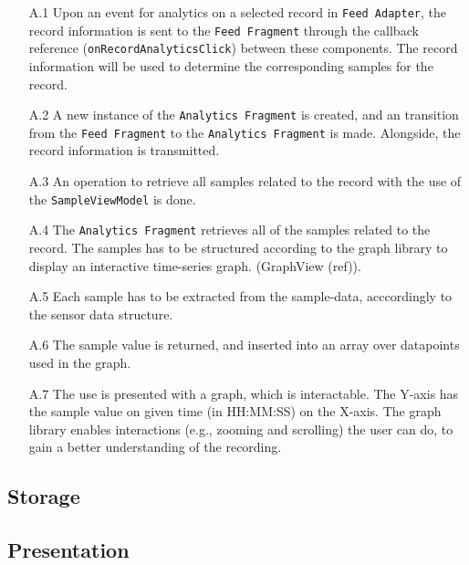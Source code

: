 \begin{itemize}
    \item[A.1] Upon an event for analytics on a selected record in \verb|Feed Adapter|, the record information is sent to the \verb|Feed Fragment| through the callback reference (\verb|onRecordAnalyticsClick|) between these components. The record information will be used to determine the corresponding samples for the record.
    \item[A.2] A new instance of the \verb|Analytics Fragment| is created, and an transition from the \verb|Feed Fragment| to the \verb|Analytics Fragment| is made. Alongside, the record information is transmitted.
    \item[A.3] An operation to retrieve all samples related to the record with the use of the \verb|SampleViewModel| is done. 
    \item[A.4] The \verb|Analytics Fragment| retrieves all of the samples related to the record. The samples has to be structured according to the graph library to display an interactive time-series graph. (GraphView (ref)).
    \item[A.5] Each sample has to be extracted from the sample-data, acccordingly to the sensor data structure.
    \item[A.6] The sample value is returned, and inserted into an array over datapoints used in the graph. 
    \item[A.7] The use is presented with a graph, which is interactable. The Y-axis has the sample value on given time (in HH:MM:SS) on the X-axis. The graph library enables interactions (e.g., zooming and scrolling) the user can do, to gain a better understanding of the recording. 
\end{itemize}



\subsection{Storage}


\subsection{Presentation}

